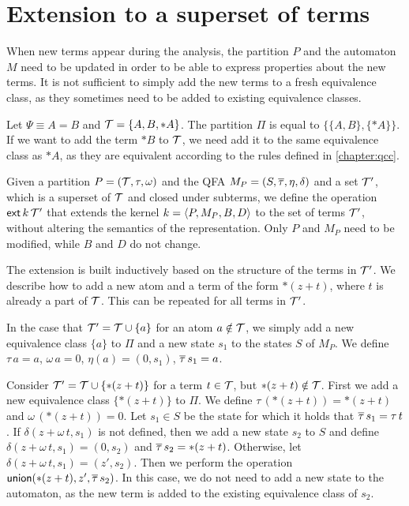 \section{Extension to a superset of terms}

When new terms appear during the analysis, the partition $P$ and the automaton $M$ need to be updated
in order to be able to express properties about the new terms.
It is not sufficient to simply add the new terms to a fresh equivalence class,
as they sometimes need to be added to existing equivalence classes.

\begin{example}
    Let $\Psi \equiv A = B$ and $\mathcal{T} = \{A, B, *A\}$.
    The partition $\Pi$ is equal to $\{\{A, B\}, \{*A\}\}$.
    If we want to add the term $*B$ to $\mathcal{T}$, we need add it to the same equivalence class as $*A$,
    as they are equivalent according to the rules defined in \cref{chapter:qcc}.
\end{example}

Given a partition $P = (\mathcal{T}, \tau, \omega)$ and the QFA $M_P = (S, \overline{\tau}, \eta, \delta)$ and a set $\mathcal{T}'$, which is a superset of $\mathcal{T}$ and closed under subterms,
we define the operation $\textsf{ext}\,{k}\,{\mathcal{T}'}$ that extends the kernel $k = \langle P, M_P, B, D\rangle$ to the set of terms $\mathcal{T}'$,
without altering the semantics of the representation.
Only $P$ and $M_P$ need to be modified, while $B$ and $D$ do not change.

The extension is built inductively based on the structure of the terms in $\mathcal{T}'$.
We describe how to add a new atom and a term of the form $*(z+t)$, where $t$ is already a part of $\mathcal{T}$.
This can be repeated for all terms in $\mathcal{T}'$.

In the case that $\mathcal{T}' = \mathcal{T} \cup \{a\}$ for an atom $a \notin \mathcal{T}$, we simply add a new
equivalence class $\{a\}$ to $\Pi$ and a new state $s_1$ to the states $S$ of $M_P$.
We define $\tau\,a = a$, $\omega\,a=0$, $\eta(a) = (0,s_1)$, $\overline{\tau}\,s_1 = a$.

Consider $\mathcal{T}' = \mathcal{T} \cup \{*(z+t)\}$ for a term $t \in \mathcal{T}$, but $*(z + t) \notin \mathcal{T}$.
First we add a new equivalence class $\{*(z+t)\}$ to $\Pi$.
We define $\tau\,(*(z+t)) = *(z+t)$ and $\omega\,(*(z+t))=0$.
Let $s_1 \in S$ be the state for which it holds that $\overline{\tau}\,s_1 = \tau\,t$.
If $\delta(z + \omega\,t,s_1)$ is not defined, then we add a new state $s_2$ to $S$
and define $\delta(z + \omega\,t, s_1) = (0, s_2)$ and $\overline{\tau}\,s_2 = *(z+t)$.
Otherwise, let $\delta(z + \omega\,t, s_1) = (z', s_2)$.
Then we perform the operation $\textsf{union}(*(z + t), z', \overline{\tau}\,s_2)$.
In this case, we do not need to add a new state to the automaton,
as the new term is added to the existing equivalence class of $s_2$.
